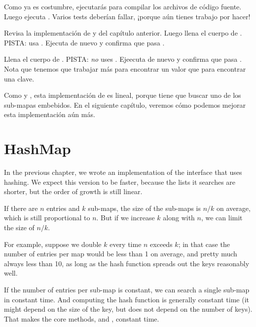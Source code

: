 \documentclass[12pt]{book}
\theoremstyle{exercise}
\begin{document}
Como ya es costumbre, ejecutarás  para compilar los archivos
de código fuente. Luego ejecuta . Varios tests deberían
fallar, ¡porque aún tienes trabajo por hacer!


Revisa la implementación de  y  del capítulo
anterior. Luego llena el cuerpo de . PISTA:
usa . Ejecuta  de nuevo y
confirma que pasa .


Llena el cuerpo de . PISTA: \emph{no} uses
.  Ejeecuta  de nuevo y confirma
que pasa . Nota que tenemos que trabajar más
para encontrar un valor que para encontrar una clave.

Como  y , esta implementación de
 es lineal, porque tiene que buscar uno de los
sub-mapas embebidos. En el siguiente capítulo, veremos cómo podemos
mejorar esta implementación aún más.



\chapter{HashMap}

In the previous chapter, we wrote an implementation of the
 interface that uses hashing.  We expect this version
to be faster, because the lists it searches are shorter, but
the order of growth is still linear.


If there are $n$ entries and $k$ sub-maps, the size of the sub-maps is
$n/k$ on average, which is still proportional to $n$.  But if we
increase $k$ along with $n$, we can limit the size of $n/k$.

For example, suppose we double $k$ every
time $n$ exceeds $k$; in that case the number of entries
per map would be less than 1 on average, and pretty much always less
than 10, as long as the hash function spreads out the keys reasonably
well.


If the number of entries per sub-map is constant, we can search a single
sub-map in constant time. And computing the hash function is generally
constant time (it might depend on the size of the key, but does not
depend on the number of keys). That makes the core  methods,
 and , constant time.
\end{document}
